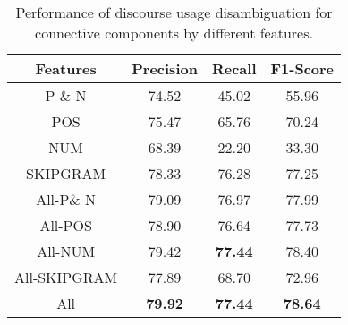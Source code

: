 \begin{table}[h]
\centering
\begin{tabular}{|c|c|c|c|}
\hline

\bf Features        & \bf Precision & \bf Recall & \bf F1-Score \\ \hline
    P \& N          &     74.52     &     45.02  &     55.96    \\ \hline
    POS             &     75.47     &     65.76  &     70.24    \\ \hline
    NUM             &     68.39     &     22.20  &     33.30    \\ \hline
    SKIPGRAM        &     78.33     &     76.28  &     77.25    \\ \hline
    All-P\& N       &     79.09     &     76.97  &     77.99    \\ \hline
    All-POS         &     78.90     &     76.64  &     77.73    \\ \hline
    All-NUM         &     79.42     & \bf 77.44  &     78.40    \\ \hline
    All-SKIPGRAM    &     77.89     &     68.70  &     72.96    \\ \hline
    All             & \bf 79.92     & \bf 77.44  & \bf 78.64    \\ \hline

\end{tabular}
\caption{\label{t:recognition-features} Performance of discourse usage
disambiguation for connective components by different features. }
\end{table}
